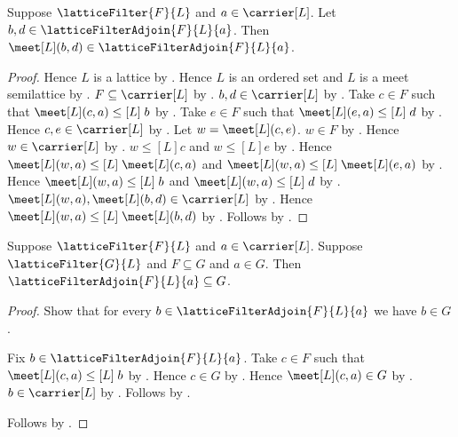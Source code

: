 \begin{theorem}\label{lattice_filter_adjoin_meet_closed}
    Suppose $\latticeFilter{F}{L}$ and $a\in\carrier[L]$.
    Let $b,d\in\latticeFilterAdjoin{F}{L}{a}$.
    Then $\meet[L](b,d)\in\latticeFilterAdjoin{F}{L}{a}$.
\end{theorem}
\begin{proof}
    Hence $L$ is a lattice by .
    Hence $L$ is an ordered set and $L$ is a meet semilattice by
        .
    $F\subseteq\carrier[L]$ by
        .
    $b,d\in\carrier[L]$ by
        .
    Take $c\in F$ such that
        $\meet[L](c,a)\mathrel{\leq[L]}b$ by
        .
    Take $e\in F$ such that
        $\meet[L](e,a)\mathrel{\leq[L]}d$ by
        .
    Hence $c,e\in\carrier[L]$ by .
    Let $w=\meet[L](c,e)$.
    $w\in F$ by .
    Hence $w\in\carrier[L]$ by .
    $w\mathrel{\leq[L]}c$ and $w\mathrel{\leq[L]}e$ by
        .
    Hence $\meet[L](w,a)\mathrel{\leq[L]}\meet[L](c,a)$ and
        $\meet[L](w,a)\mathrel{\leq[L]}\meet[L](e,a)$ by
        .
    Hence $\meet[L](w,a)\mathrel{\leq[L]}b$ and
        $\meet[L](w,a)\mathrel{\leq[L]}d$ by
        .
    $\meet[L](w,a),\meet[L](b,d)\in\carrier[L]$ by
        .
    Hence $\meet[L](w,a)\mathrel{\leq[L]}\meet[L](b,d)$ by
        .
    Follows by .
\end{proof}

\begin{theorem}\label{lattice_filter_adjoin_least}
    Suppose $\latticeFilter{F}{L}$ and $a\in\carrier[L]$.
    Suppose $\latticeFilter{G}{L}$ and $F\subseteq G$ and $a\in G$.
    Then $\latticeFilterAdjoin{F}{L}{a}\subseteq G$.
\end{theorem}
\begin{proof}
    Show that for every $b\in\latticeFilterAdjoin{F}{L}{a}$ we have
        $b\in G$.
    \begin{subproof}
        Fix $b\in\latticeFilterAdjoin{F}{L}{a}$.
        Take $c\in F$ such that
            $\meet[L](c,a)\mathrel{\leq[L]}b$ by
            .
        Hence $c\in G$ by .
        Hence $\meet[L](c,a)\in G$ by
            .
        $b\in\carrier[L]$ by
            .
        Follows by .
    \end{subproof}
    Follows by .
\end{proof}

